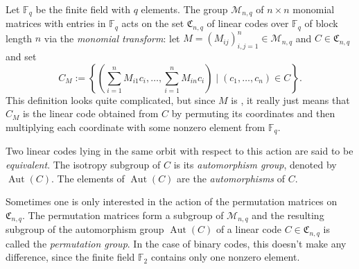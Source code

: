 \documentclass[12pt]{article}
\newcommand{\Sum}{\sum\limits}
\newcommand{\mbb}{\mathbb}
\newcommand{\mc}{\mathcal}
\newcommand{\mf}{\mathfrak}
\DeclareMathOperator{\Aut}{Aut}
\begin{document}
Let $\mbb{F}_q$ be the finite field with $q$ elements. The group
$\mc{M}_{n,q}$ of $n\times n$ monomial matrices with entries in $\mbb{F}_q$
acts on the set $\mf{C}_{n,q}$ of linear codes over $\mbb{F}_q$ of
block length $n$ via the \emph{monomial transform}: let $M=(M_{ij})_{i,j=1}^n\in\mc{M}_{n,q}$ and $C\in\mf{C}_{n,q}$ and set
\begin{equation*}
C_M:=\left\{\left(\Sum_{i=1}^nM_{i1}c_i,\ldots,\Sum_{i=1}^nM_{in}c_i\right)\mid(c_1,\ldots,c_n)\in C\right\}.
\end{equation*}
This definition looks quite complicated, but since $M$ is , it
really just means that $C_M$ is the linear code obtained from $C$ by
permuting its coordinates and then multiplying each coordinate with
some nonzero element from $\mbb{F}_q$.

Two linear codes lying in the same orbit with respect to this action
are said to be \emph{equivalent}. The isotropy subgroup of $C$
is its \emph{automorphism group}, denoted by $\Aut(C)$. The elements
of $\Aut(C)$ are the \emph{automorphisms} of $C$.

Sometimes one is only interested in the action of the permutation
matrices on $\mf{C}_{n,q}$. The permutation matrices form a subgroup
of $\mc{M}_{n,q}$ and the resulting subgroup of the automorphism group
$\Aut(C)$ of a linear code $C\in\mf{C}_{n,q}$ is called the
\emph{permutation group}. In the case of binary codes, this doesn't
make any difference, since the finite field $\mbb{F}_2$ contains only
one nonzero element.
\end{document}
